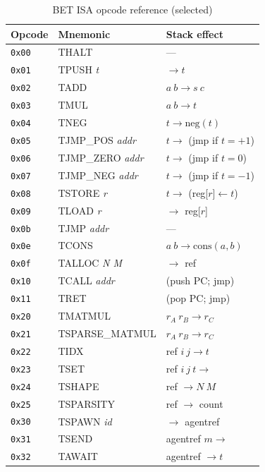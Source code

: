 \documentclass[11pt,a4paper]{article}
\begin{document}
\begin{table}[htbp]
\centering
\small
\caption{BET ISA opcode reference (selected)}
\label{tab:isa}
\begin{tabular}{lll}
\toprule
Opcode & Mnemonic & Stack effect \\
\midrule
\texttt{0x00} & THALT            & --- \\
\texttt{0x01} & TPUSH \textit{t} & $\to t$ \\
\texttt{0x02} & TADD             & $a\ b \to s\ c$ \\
\texttt{0x03} & TMUL             & $a\ b \to t$ \\
\texttt{0x04} & TNEG             & $t \to \mathrm{neg}(t)$ \\
\texttt{0x05} & TJMP\_POS \textit{addr} & $t \to$ (jmp if $t=+1$) \\
\texttt{0x06} & TJMP\_ZERO \textit{addr}& $t \to$ (jmp if $t=0$) \\
\texttt{0x07} & TJMP\_NEG \textit{addr} & $t \to$ (jmp if $t=-1$) \\
\texttt{0x08} & TSTORE \textit{r}& $t \to$ (reg[$r$]$\leftarrow t$) \\
\texttt{0x09} & TLOAD \textit{r} & $\to$ reg[$r$] \\
\texttt{0x0b} & TJMP \textit{addr}& --- \\
\texttt{0x0e} & TCONS            & $a\ b \to \mathrm{cons}(a,b)$ \\
\texttt{0x0f} & TALLOC \textit{N M} & $\to$ ref \\
\texttt{0x10} & TCALL \textit{addr} & (push PC; jmp) \\
\texttt{0x11} & TRET            & (pop PC; jmp) \\
\texttt{0x20} & TMATMUL         & $r_A\ r_B \to r_C$ \\
\texttt{0x21} & TSPARSE\_MATMUL & $r_A\ r_B \to r_C$ \\
\texttt{0x22} & TIDX            & ref $i\ j \to t$ \\
\texttt{0x23} & TSET            & ref $i\ j\ t \to$ \\
\texttt{0x24} & TSHAPE          & ref $\to N\ M$ \\
\texttt{0x25} & TSPARSITY       & ref $\to$ count \\
\texttt{0x30} & TSPAWN \textit{id} & $\to$ agentref \\
\texttt{0x31} & TSEND           & agentref $m \to$ \\
\texttt{0x32} & TAWAIT          & agentref $\to t$ \\
\bottomrule
\end{tabular}
\end{table}
\end{document}
